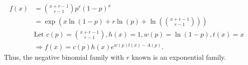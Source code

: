 \documentclass[12pt]{article}
\newenvironment{problem}[2][Problem]{\begin{trivlist}
\item[\hskip \labelsep {\bfseries #1}\hskip \labelsep {\bfseries #2.}]}
{\end{trivlist}}
\begin{document}
\begin{problem}{6}
\begin{itemize}
\begin{itemize}
\[      \]
      \[
        \begin{aligned}
          f(x) &= \binom{x+r-1}{r-1} p^r (1-p)^x \\
          &= \exp\left( x \ln(1-p) + r \ln(p) + \ln\left(
          \binom{x+r-1}{r-1}\right) \right) \\
          &\text{Let } c(p) = \binom{x+r-1}{r-1}, h(x) = 1, 
          w(p) = \ln(1-p), t(x) = x\\
          &\Rightarrow f(x) = c(p) h(x) e^{w(p) t(x) - A(p)}.
        \end{aligned}
      \]
      Thus, the negative binomial family with $r$ known is an exponential family.
    \end{itemize}
  \end{itemize}
\end{problem}
\end{document}
